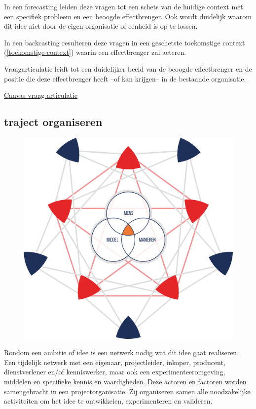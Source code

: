 \documentclass[
]{book}
\begin{document}
In een forecasting leiden deze vragen tot een schets van de huidige context met een specifiek probleem en een beoogde effectbrenger. Ook wordt duidelijk waarom dit idee niet door de eigen organisatie of eenheid is op te lossen.

In een backcasting resulteren deze vragen in een geschetste toekomstige context (\ref{toekomstige-context}) waarin een effectbrenger zal acteren.

Vraagarticulatie leidt tot een duidelijker beeld van de beoogde effectbrenger en de positie die deze effectbrenger heeft --of kan krijgen-- in de bestaande organisatie.

\href{data/images/20200116-CDE-canvassen-vraagarticulatie.png}{Canvas vraag articulatie}

\hypertarget{traject-organiseren}{%
\subsection{traject organiseren}\label{traject-organiseren}}

\begin{figure}

{\centering \includegraphics[width=350pt]{data/images/20210401-MDI-trajectorganiseren} 

}

\caption{ }\label{fig:unnamed-chunk-10}
\end{figure}

Rondom een ambitie of idee is een netwerk nodig wat dit idee gaat realiseren. Een tijdelijk netwerk met een eigenaar, projectleider, inkoper, producent, dienstverlener en/of kenniswerker, maar ook een experimenteeromgeving, middelen en specifieke kennis en vaardigheden. Deze actoren en factoren worden samengebracht in een projectorganisatie. Zij organiseren samen alle noodzakelijke activiteiten om het idee te ontwikkelen, experimenteren en valideren.
\end{document}
